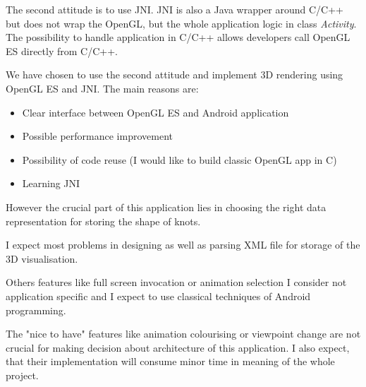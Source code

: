 The second attitude is to use JNI. JNI is also a Java wrapper around C/C++ but does not wrap the OpenGL,
but the whole application logic in class {\it Activity}. 
The possibility to handle application in C/C++ allows developers call OpenGL ES directly from C/C++.

We have chosen to use the second attitude and implement 3D rendering using OpenGL ES and JNI.
The main reasons are:
\begin{itemize}
  \item Clear interface between OpenGL ES and Android application
  \item Possible performance improvement
  \item Possibility of code reuse (I would like to build classic OpenGL app in C)
  \item Learning JNI
\end{itemize}

However the crucial part of this application lies 
in choosing the right data representation for storing the shape of knots.

I expect most problems in designing as well as parsing XML file
for storage of the 3D visualisation.

Others features like full screen invocation or animation selection
I consider not application specific and I expect
to use classical techniques of Android programming.

The "nice to have" features like animation colourising 
or viewpoint change are not crucial for making decision
about architecture of this application. 
I also expect, that their implementation will consume minor time
in meaning of the whole project.

